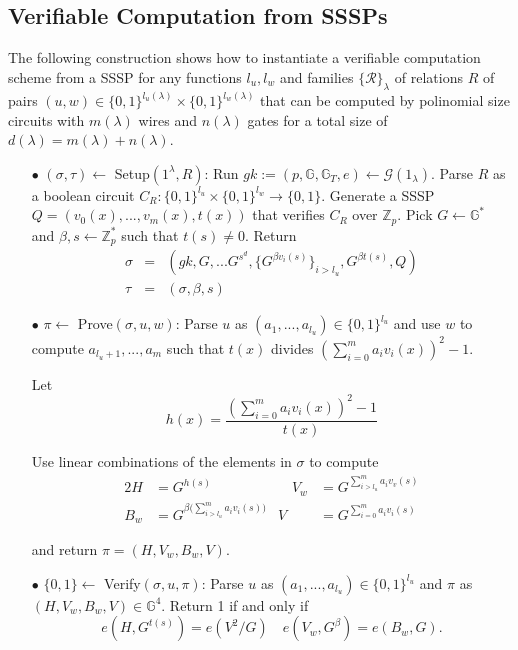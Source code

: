\documentclass[lnbip]{svmultln}
\begin{document}
\subsection{Verifiable Computation from SSSPs}

The following construction shows how to instantiate a verifiable computation scheme from a SSSP for any functions $l_u, l_w$ and families $\{\mathcal{R}\}_\lambda$ of relations $R$ of pairs $(u,w) \in \{0,1\}^{l_u(\lambda)} \times \{0,1\}^{l_w(\lambda)} $ that can be computed by polinomial size circuits with $m(\lambda)$ wires and $n(\lambda)$ gates for a total size of $d(\lambda)=m(\lambda)+n(\lambda)$. \\

\begin{itemize}
\item[$\bullet$] $(\sigma,\tau) \leftarrow$ Setup$(1^\lambda,R)$: Run $gk := (p,\mathbb{G},\mathbb{G}_T,e) \leftarrow \mathcal{G}(1_\lambda)$. Parse $R$ as a boolean circuit $C_R:\{0,1\}^{l_u}\times \{0,1\}^{l_w} \rightarrow \{0,1\}$. Generate a SSSP $Q = (v_0(x),...,v_m(x),t(x))$ that verifies $C_R$ over $\mathbb{Z}_p$. Pick $G \leftarrow \mathbb{G}^*$ and $\beta,s \leftarrow \mathbb{Z}_p^*$ such that $t(s) \neq 0$. Return
\begin{eqnarray*}
  \sigma &=& (gk,G,...G^{s^d},\{G^{\beta v_i(s)}\}_{i>l_u},G^{\beta t(s)},Q)\\
  \tau &=& (\sigma,\beta,s)
\end{eqnarray*}

\item[$\bullet$] $\pi \leftarrow$ Prove$(\sigma, u,w)$: Parse $u$ as $(a_1,...,a_{l_u}) \in \{0,1\}^{l_u}$ and use $w$ to compute $a_{l_u+1},...,a_m$ such that $t(x)$ divides $\left(\sum\limits_{i=0}^ma_i v_i(x)\right)^2-1$.

Let 
$$h(x) = \frac{\left(\sum\limits_{i=0}^ma_i v_i(x)\right)^2-1}{t(x)}$$

Use linear combinations of the elements in $\sigma$ to compute
\begin{alignat*}{2}
 H &= G^{h(s)}  &\quad V_w &= G^{\sum\limits_{i>l_u}^m a_iv_v(s)} \\  
 B_w &= G^{\beta\big(\sum\limits_{i>l_u}^m a_iv_i(s)\big)} & 
 V &= G^{\sum\limits_{i=0}^m a_iv_i(s)}
\end{alignat*}

and return $\pi=(H,V_w,B_w,V)$.\\

\item[$\bullet$] $\{0,1\} \leftarrow$ Verify$(\sigma,u,\pi)$: Parse $u$ as $(a_1,...,a_{l_u})\in \{0,1\}^{l_u}$ and $\pi$ as $(H,V_w,B_w,V) \in \mathbb{G}^4$. Return 1 if and only if
$$e(H,G ^{t(s)})=e(V^2/G) \quad e(V_w,G^\beta)=e(B_w,G).  $$
\end{itemize}
\end{document}
